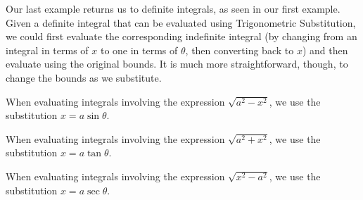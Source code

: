 
Our last example returns us to definite integrals, as seen in our first example. Given a definite integral that can be evaluated using Trigonometric Substitution, we could first evaluate the corresponding indefinite integral (by changing from an integral in terms of $x$ to one in terms of $\theta$, then converting back to $x$) and then evaluate using the original bounds. It is much more straightforward, though, to change the bounds as we substitute.



\begin{summary}
\item When evaluating integrals involving the expression $\sqrt{a^2-x^2}$, we use the substitution $x=a\sin \theta$.
\item When evaluating integrals involving the expression $\sqrt{a^2+x^2}$, we use the substitution $x=a\tan \theta$.
\item When evaluating integrals involving the expression $\sqrt{x^2-a^2}$, we use the substitution $x=a\sec \theta$.
\end{summary}

\clearpage

 

\cleardoublepage